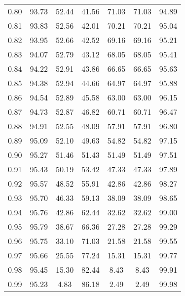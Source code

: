 \begin{tabular}{|c|c|c|c|c|c|c|}
      0.80 &     93.73 &     52.44 &      41.56 &   71.03 &      71.03 &         94.89 \\
      0.81 &     93.83 &     52.56 &      42.01 &   70.21 &      70.21 &         95.04 \\
      0.82 &     93.95 &     52.66 &      42.52 &   69.16 &      69.16 &         95.21 \\
      0.83 &     94.07 &     52.79 &      43.12 &   68.05 &      68.05 &         95.41 \\
      0.84 &     94.22 &     52.91 &      43.86 &   66.65 &      66.65 &         95.63 \\
      0.85 &     94.38 &     52.94 &      44.66 &   64.97 &      64.97 &         95.88 \\
      0.86 &     94.54 &     52.89 &      45.58 &   63.00 &      63.00 &         96.15 \\
      0.87 &     94.73 &     52.87 &      46.82 &   60.71 &      60.71 &         96.47 \\
      0.88 &     94.91 &     52.55 &      48.09 &   57.91 &      57.91 &         96.80 \\
      0.89 &     95.09 &     52.10 &      49.63 &   54.82 &      54.82 &         97.15 \\
      0.90 &     95.27 &     51.46 &      51.43 &   51.49 &      51.49 &         97.51 \\
      0.91 &     95.43 &     50.19 &      53.42 &   47.33 &      47.33 &         97.89 \\
      0.92 &     95.57 &     48.52 &      55.91 &   42.86 &      42.86 &         98.27 \\
      0.93 &     95.70 &     46.33 &      59.13 &   38.09 &      38.09 &         98.65 \\
      0.94 &     95.76 &     42.86 &      62.44 &   32.62 &      32.62 &         99.00 \\
      0.95 &     95.79 &     38.67 &      66.36 &   27.28 &      27.28 &         99.29 \\
      0.96 &     95.75 &     33.10 &      71.03 &   21.58 &      21.58 &         99.55 \\
      0.97 &     95.66 &     25.55 &      77.24 &   15.31 &      15.31 &         99.77 \\
      0.98 &     95.45 &     15.30 &      82.44 &    8.43 &       8.43 &         99.91 \\
      0.99 &     95.23 &      4.83 &      86.18 &    2.49 &       2.49 &         99.98 \\
\bottomrule
\end{tabular}
